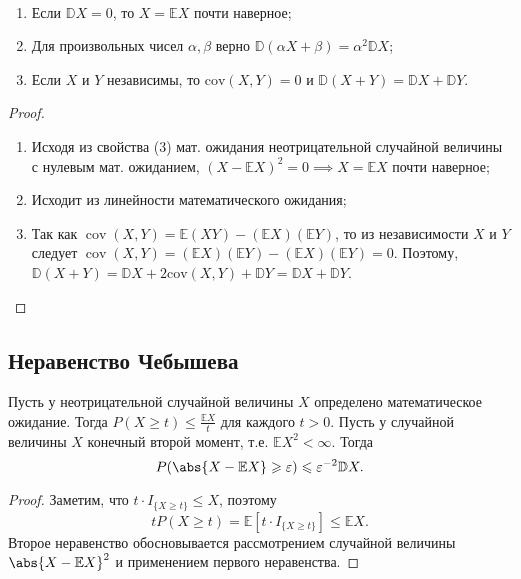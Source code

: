 \begin{theorem*}~
    \begin{enumerate}
        \item Если $\mathbb{D}X = 0$, то $X = \mathbb{E}X$ почти наверное;
        \item Для произвольных чисел $\alpha, \beta$ верно $\mathbb{D}(\alpha X + \beta) = \alpha^2 \mathbb{D}X$;
        \item Если $X$ и $Y$ независимы, то $\mathrm{cov}(X, Y) = 0$ и $\mathbb{D}(X + Y) = \mathbb{D}X + \mathbb{D}Y$.
    \end{enumerate}
\end{theorem*}

\begin{proof}~
    \begin{enumerate}
        \item Исходя из свойства (3) мат. ожидания неотрицательной случайной величины с нулевым мат. ожиданием, $(X - \mathbb{E}X)^2 = 0 \implies X = \mathbb{E}X$ почти наверное;
        \item Исходит из линейности математического ожидания;
        \item Так как $\operatorname{cov}(X, Y) = \mathbb{E}(XY) - (\mathbb{E}X)(\mathbb{E}Y)$, то из независимости $X$ и $Y$ следует $\operatorname{cov}(X, Y) = (\mathbb{E}X)(\mathbb{E}Y) - (\mathbb{E}X)(\mathbb{E}Y) = 0$.
        Поэтому, $\mathbb{D}(X + Y) = \mathbb{D}X + 2 \mathrm{\mathrm{cov}}(X, Y) + \mathbb{D}Y  = \mathbb{D}X + \mathbb{D}Y$. \qedhere
    \end{enumerate}
\end{proof}

\sectionbreak
\subsection{Неравенство Чебышева}

\begin{proposal*}
    Пусть у неотрицательной случайной величины $X$ определено математическое ожидание.
    Тогда $P(X \geqslant t) \leqslant \frac{\mathbb{E}X}{t}$ для каждого $t > 0$.
    Пусть у случайной величины $X$ конечный второй момент, т.е. $\mathbb{E}X^2 < \infty$.
    Тогда
    \[
        P(\abs{X - \mathbb{E}X} \geqslant \varepsilon) \leqslant \varepsilon^{-2} \mathbb{D}X.
    \]
\end{proposal*}

\begin{proof}
    Заметим, что $t \cdot I_{\{X \geqslant t\}} \leqslant X$, поэтому
    \[
        t P(X \geqslant t) = \mathbb{E}[t \cdot I_{\{X \geqslant t\}}] \leqslant \mathbb{E}X.
    \]
    Второе неравенство обосновывается рассмотрением случайной величины $\abs{X-\mathbb{E}X}^2$ и применением первого неравенства.
\end{proof}